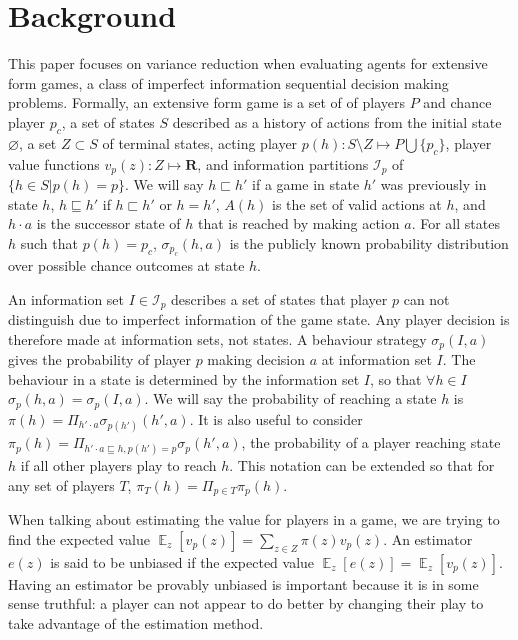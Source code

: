 \documentclass[letterpaper]{article}
\begin{document}
\section{Background}
This paper focuses on variance reduction when evaluating agents for
extensive form games, a class of imperfect information sequential
decision making problems. Formally, an extensive form game is a set of
of players $P$ and chance player $p_c$, a set of states $S$ described
as a history of actions from the initial state $\varnothing$, a set
$Z \subset S$ of terminal states, acting player $p(h) : S \setminus
Z \mapsto P \bigcup \{p_c\}$, player value functions $v_p(z) :
Z \mapsto \mathbf{R}$, and information partitions $\mathcal{I}_p$ of
$\{h \in S | p(h)=p\}$. We will say $h \sqsubset h'$ if a game in
state $h'$ was previously in state $h$, $h \sqsubseteq h'$ if
$h \sqsubset h'$ or $h=h'$, $A(h)$ is the set of valid actions at $h$,
and $h \cdot a$ is the successor state of $h$ that is reached by
making action $a$. For all states $h$ such that $p(h) = p_c$,
$\sigma_{p_c}(h,a)$ is the publicly known probability distribution
over possible chance outcomes at state $h$.

An information set $I \in \mathcal{I}_p$ describes a set of states
that player $p$ can not distinguish due to imperfect information of
the game state. Any player decision is therefore made at information
sets, not states. A behaviour strategy $\sigma_p(I,a)$ gives the
probability of player $p$ making decision $a$ at information set
$I$. The behaviour in a state is determined by the information set
$I$, so that $\forall h \in I$ $\sigma_p(h,a) = \sigma_p(I,a)$. We
will say the probability of reaching a state $h$ is $\pi(h)
= \Pi_{h' \cdot a} \sigma_{p(h')}(h',a)$.  It is also useful to
consider $\pi_p(h) = \Pi_{h' \cdot a \sqsubseteq h,
p(h')=p} \sigma_p(h',a)$, the probability of a player reaching state
$h$ if all other players play to reach $h$. This notation can be
extended so that for any set of players $T$, $\pi_{T}(h) = \Pi_{p \in
T} \pi_p(h)$.

When talking about estimating the value for players in a game, we are
trying to find the expected value $\mathop{\mathbb{E}}_z[v_p(z)]
= \sum_{z \in Z}\pi(z)v_p(z)$. An estimator $e(z)$ is said to be
unbiased if the expected value $\mathop{\mathbb{E}}_z[e(z)]
= \mathop{\mathbb{E}}_z[v_p(z)]$. Having an estimator be provably
unbiased is important because it is in some sense truthful: a player
can not appear to do better by changing their play to take advantage
of the estimation method.
\end{document}
